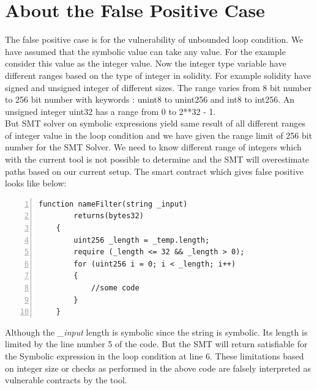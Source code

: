 \section*{About the False Positive Case}
The false positive case is for the vulnerability of unbounded loop condition. We have assumed that the symbolic value can take any value. For the example consider this value as the integer value. Now the integer type variable have different ranges based on the type of integer in solidity. For example solidity have signed and unsigned integer of different sizes. The range varies from 8 bit number to 256 bit number with keywords : unint8 to unint256 and int8 to int256. An unsigned integer uint32 has a range from 0 to 2**32 - 1\cite{integer}. \\
But SMT solver on symbolic expressions yield same result of all different ranges of integer value in the loop condition and we have given the range limit of 256 bit number for the SMT Solver. We need to know different range of integers which with the current tool is not possible to determine and the SMT will overestimate paths based on our current setup. The smart contract which gives false positive looks like below:
\begin{Verbatim}[numbers=left,xleftmargin=5mm]
    function nameFilter(string _input)
        returns(bytes32)
    {
        uint256 _length = _temp.length;
        require (_length <= 32 && _length > 0);
        for (uint256 i = 0; i < _length; i++)
        {
            //some code
        }
    }
\end{Verbatim}
Although the \emph{\_input} length is symbolic since the string is symbolic. Its length is limited by the line number 5 of the code. But the SMT will return satisfiable for the Symbolic expression in the loop condition at line 6. These limitations based on integer size or checks as performed in the above code are falsely interpreted as vulnerable contracts by the tool.
